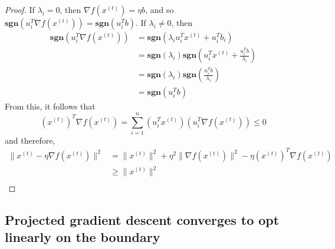 \documentclass[11pt]{article}
\begin{document}
\begin{proof}
If $\lambda_i = 0$, then $\nabla f(x^{(t)}) = \eta b$, and so $\mathbf{sgn}\left(u_i^T \nabla f(x^{(t)})\right) = \mathbf{sgn}(u_i^Tb)$. If $\lambda_i \neq 0$, then
\begin{align*}
\mathbf{sgn}\left(u_i^T \nabla f(x^{(t)})\right) &= \mathbf{sgn}\left(\lambda_i u_i^Tx^{(t)} + u_i^Tb_i\right) \\
								&=  \mathbf{sgn}(\lambda_i)\mathbf{sgn}\left( u_i^Tx^{(t)} + \frac{u_i^Tb}{\lambda_i}\right) \\
								&= \mathbf{sgn}(\lambda_i)\mathbf{sgn}\left( \frac{u_i^Tb}{\lambda_i} \right) \\
								&= \mathbf{sgn}(u_i^Tb)
\end{align*}
From this, it follows that
\[ (x^{(t)})^T\nabla f(x^{(t)}) = \sum_{i = 1}^n (u_i^Tx^{(t)})( u_i^T\nabla f(x^{(t)})) \leq 0 \]
and therefore,
\begin{align*}
\|x^{(t)} - \eta \nabla f(x^{(t)}) \|^2 &= \|x^{(t)}\|^2 + \eta^2 \|\nabla f(x^{(t)})\|^2 - \eta (x^{(t)})^T\nabla f(x^{(t)}) \\
						&\geq \|x^{(t)}\|^2 \\
\end{align*}
\end{proof}

\subsection{Projected gradient descent converges to opt linearly on the boundary}


\end{document}

